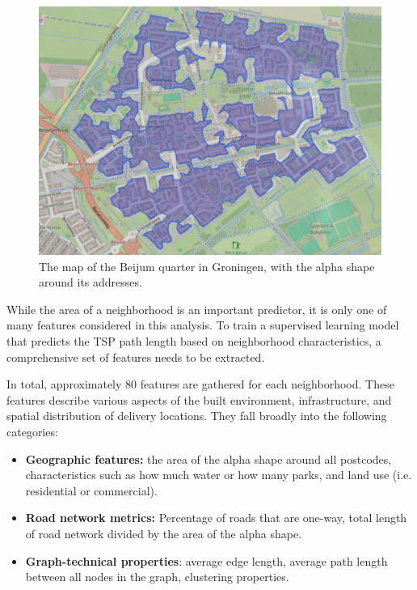 \begin{figure}[H]
	\centering
	\includegraphics[width=\textwidth]{Pictures/better_hull_beijum.png}
	\caption{The map of the Beijum quarter in Groningen, with the alpha shape around its addresses.}
	\label{fig:Beijum}
\end{figure}

While the area of a neighborhood is an important predictor, it is only one of many features considered in this analysis.
To train a supervised learning model that predicts the TSP path length based on neighborhood characteristics, a comprehensive set
of features needs to be extracted.

In total, approximately 80 features are gathered for each neighborhood. These features describe various aspects of the built environment, infrastructure,
and spatial distribution of delivery locations. They fall broadly into the following categories:

\begin{itemize}
	\item \textbf{Geographic features:} the area of the alpha shape around all postcodes, characteristics such as how much water or how many parks,
	      and land use (i.e. residential or commercial).
	\item \textbf{Road network metrics:} Percentage of roads that are one-way, total length of road network divided by the area of the alpha shape.
	\item \textbf{Graph-technical properties}: average edge length, average path length between all nodes in the graph, clustering properties.
\end{itemize}

